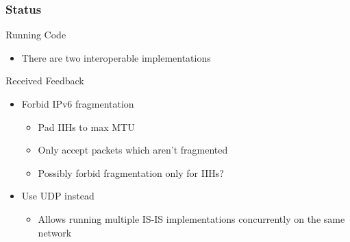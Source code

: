 \documentclass[12pt]{beamer}
\begin{document}
\begin{frame}
  \frametitle{Status}
  \begin{block}{Running Code}
    \begin{itemize}
      \item There are two interoperable implementations
    \end{itemize}
  \end{block}
  \begin{block}{Received Feedback}
    \begin{itemize}
      \item Forbid IPv6 fragmentation
      \begin{itemize}
        \item Pad IIHs to max MTU
        \item Only accept packets which aren't fragmented
        \item Possibly forbid fragmentation only for IIHs?
      \end{itemize}
      \item Use UDP instead
      \begin{itemize}
        \item Allows running multiple IS-IS implementations concurrently on the
              same network
      \end{itemize}
    \end{itemize}
  \end{block}
\end{frame}
\end{document}
